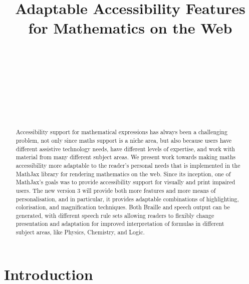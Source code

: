 \documentclass{sig-alternate}
\begin{document}


\title{Adaptable Accessibility Features for Mathematics on the Web}
  

\author{
  \\
  \\
  \\
  \\
  \\
  \\
  \\
}

\maketitle

\begin{abstract}
  Accessibility support for mathematical expressions has always been a
  challenging problem, not only since maths support is a niche area,
  but also because users have different assistive technology needs,
  have different levels of expertise, and work with material from many different
  subject areas. We present work towards making maths accessibility more
  adaptable to the reader's personal needs that is implemented in
  the MathJax library for rendering mathematics on the web. Since its
  inception, one of MathJax's goals was to provide accessibility support for
  visually and print impaired users. The new version 3 will provide both more
  features and more means of personalisation, and in particular, it provides
  adaptable combinations of highlighting,
  colorisation, and magnification techniques. Both Braille and speech output can
  be generated, with different speech rule sets allowing readers to flexibly change
  presentation and adaptation for improved interpretation of formulas in
  different subject areas, like Physics, Chemistry, and Logic.
\end{abstract}



\section{Introduction}
\end{document}
